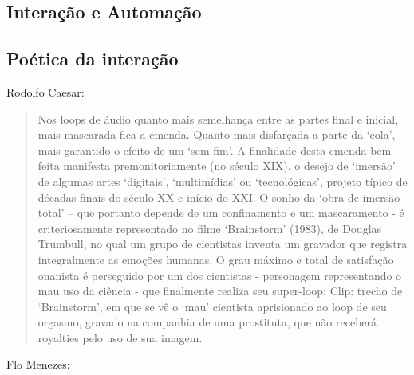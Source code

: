 \documentclass[draft]{ppgmus}
\begin{document}
\subsection{Interação e Automação}


\subsection{Poética da interação}


Rodolfo Caesar:

\begin{quotation}
 Nos loops de áudio quanto mais semelhança entre as partes final e inicial, mais mascarada fica a
emenda. Quanto mais disfarçada a parte da ‘cola’, mais garantido o efeito de um ‘sem fim’. A finalidade
desta emenda bem-feita manifesta premonitoriamente (no século XIX), o desejo de ‘imersão’ de algumas
artes ‘digitais’, ‘multimídias’ ou ‘tecnológicas’, projeto típico de décadas finais do século XX e início do
XXI. O sonho da ‘obra de imersão total’ – que portanto depende de um confinamento e um mascaramento -
é criteriosamente representado no filme ‘Brainstorm’ (1983), de Douglas Trumbull, no qual um grupo de
cientistas inventa um gravador que registra integralmente as emoções humanas. O grau máximo e total de
satisfação onanista é perseguido por um dos cientistas - personagem representando o mau uso da ciência -
que finalmente realiza seu super-loop:
Clip: trecho de ‘Brainstorm’, em que se vê o ‘mau’ cientista aprisionado ao loop de seu orgasmo, gravado na
companhia de uma prostituta, que não receberá royalties pelo uso de sua imagem.
\end{quotation} 

Flo Menezes:
\end{document}
